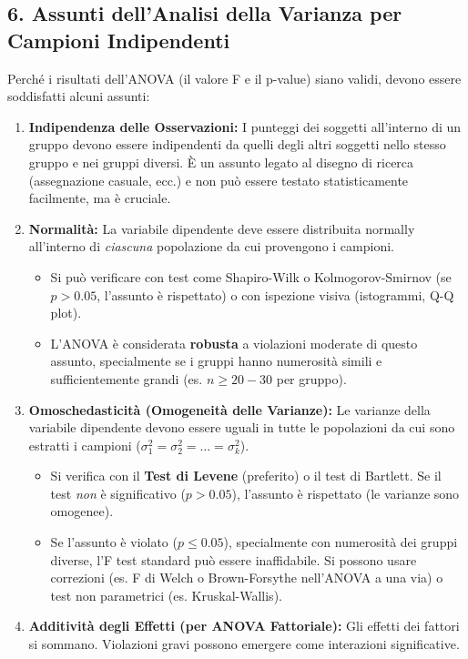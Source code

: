 \documentclass[12pt, a4paper]{article}
\newcommand{\popvar}{\sigma^2}
\begin{document}
\subsection*{6. Assunti dell'Analisi della Varianza per Campioni Indipendenti}
Perché i risultati dell'ANOVA (il valore F e il p-value) siano validi, devono essere soddisfatti alcuni assunti:
\begin{enumerate}
    \item \textbf{Indipendenza delle Osservazioni:} I punteggi dei soggetti all'interno di un gruppo devono essere indipendenti da quelli degli altri soggetti nello stesso gruppo e nei gruppi diversi. È un assunto legato al disegno di ricerca (assegnazione casuale, ecc.) e non può essere testato statisticamente facilmente, ma è cruciale.
    \item \textbf{Normalità:} La variabile dipendente deve essere distribuita normally all'interno di \textit{ciascuna} popolazione da cui provengono i campioni.
        \begin{itemize}
            \item Si può verificare con test come Shapiro-Wilk o Kolmogorov-Smirnov (se $p > 0.05$, l'assunto è rispettato) o con ispezione visiva (istogrammi, Q-Q plot).
            \item L'ANOVA è considerata \textbf{robusta} a violazioni moderate di questo assunto, specialmente se i gruppi hanno numerosità simili e sufficientemente grandi (es. $n \ge 20-30$ per gruppo).
        \end{itemize}
    \item \textbf{Omoschedasticità (Omogeneità delle Varianze):} Le varianze della variabile dipendente devono essere uguali in tutte le popolazioni da cui sono estratti i campioni ($\popvar_1 = \popvar_2 = \dots = \popvar_k$).
        \begin{itemize}
            \item Si verifica con il \textbf{Test di Levene} (preferito) o il test di Bartlett. Se il test \textit{non} è significativo ($p > 0.05$), l'assunto è rispettato (le varianze sono omogenee).
            \item Se l'assunto è violato ($p \le 0.05$), specialmente con numerosità dei gruppi diverse, l'F test standard può essere inaffidabile. Si possono usare correzioni (es. F di Welch o Brown-Forsythe nell'ANOVA a una via) o test non parametrici (es. Kruskal-Wallis).
        \end{itemize}
    \item \textbf{Additività degli Effetti (per ANOVA Fattoriale):} Gli effetti dei fattori si sommano. Violazioni gravi possono emergere come interazioni significative.
\end{enumerate}
\end{document}

